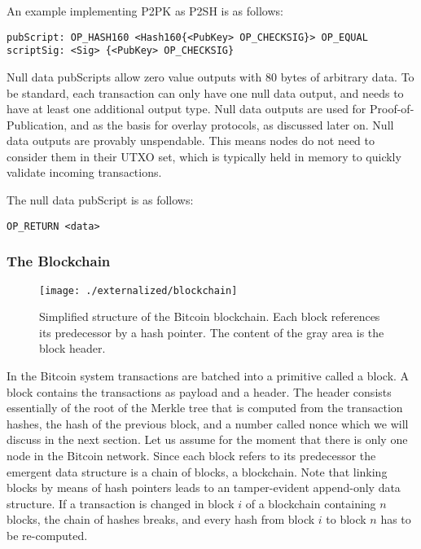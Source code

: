An example implementing P2PK as P2SH is as follows:

\begin{lstlisting}[breaklines]
pubScript: OP_HASH160 <Hash160{<PubKey> OP_CHECKSIG}> OP_EQUAL
scriptSig: <Sig> {<PubKey> OP_CHECKSIG}
\end{lstlisting}

Null data pubScripts allow zero value outputs with 80 bytes of arbitrary data. To be standard, each transaction can only have one null data output, and needs to have at least one additional output type. Null data outputs are used for Proof-of-Publication, and as the basis for overlay protocols, as discussed later on. Null data outputs are provably unspendable. This means nodes do not need to consider them in their UTXO set, which is typically held in memory to quickly validate incoming transactions. 

The null data pubScript is as follows:
\begin{lstlisting}
OP_RETURN <data>
\end{lstlisting}

\subsubsection{The Blockchain}
\label{sec:blockchain}

 \begin{figure*}[!t]
    \centering
    \texttt{[image: ./externalized/blockchain]}
    \caption{Simplified structure of the Bitcoin blockchain. Each block references its predecessor by a hash pointer. The content of the gray area is the block header.}
    \label{fig:blockchain}
  \end{figure*}

In the Bitcoin system transactions are batched into a primitive called a block. A block contains the transactions as payload and a header. The header consists essentially of the root of the Merkle tree that is computed from the transaction hashes, the hash of the previous block, and a number called nonce which we will discuss in the next section. Let us assume for the moment that there is only one node in the Bitcoin network. Since each block refers to its predecessor the emergent data structure is a chain of blocks, a blockchain. Note that linking blocks by means of hash pointers leads to an tamper-evident append-only data structure. If a transaction is changed in block $i$ of a blockchain containing $n$ blocks, the chain of hashes breaks, and every hash from block $i$ to block $n$ has to be re-computed.


